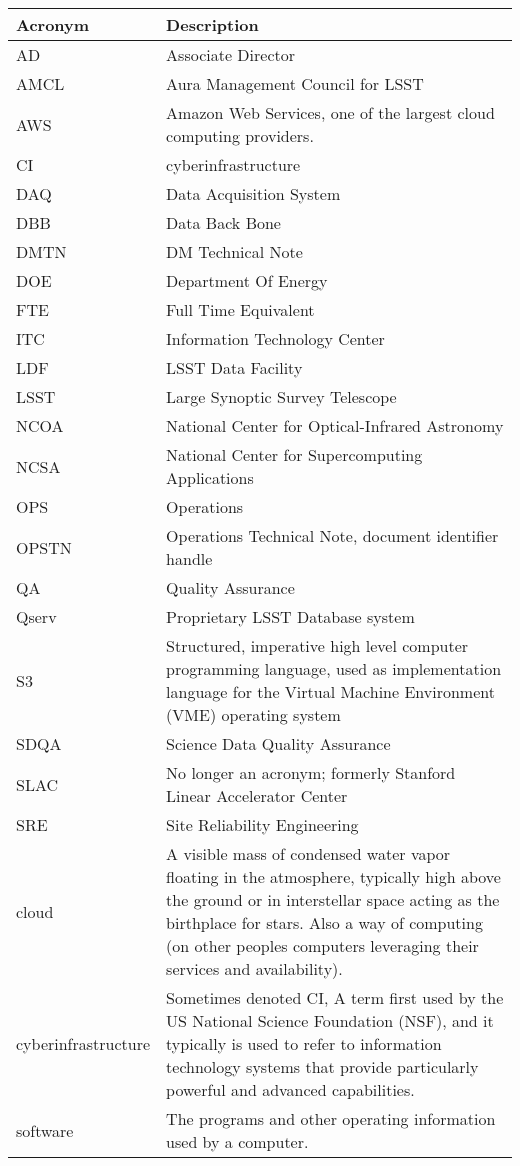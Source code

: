 \addtocounter{table}{-1}
\begin{longtable}{|l|p{}|}\hline
\textbf{Acronym} & \textbf{Description}  \\\hline

AD & Associate Director \\\hline
AMCL & Aura Management Council for LSST \\\hline
AWS & Amazon Web Services, one of the largest cloud computing providers. \\\hline
CI & \gls{cyberinfrastructure} \\\hline
DAQ & Data Acquisition System \\\hline
DBB & Data Back Bone \\\hline
DMTN & DM Technical Note \\\hline
DOE & Department Of Energy \\\hline
FTE & Full Time Equivalent \\\hline
ITC & Information Technology Center \\\hline
LDF & LSST Data Facility \\\hline
LSST & Large Synoptic Survey Telescope \\\hline
NCOA & National Center for Optical-Infrared Astronomy \\\hline
NCSA & National Center for Supercomputing Applications \\\hline
OPS & Operations \\\hline
OPSTN & Operations Technical Note, document identifier handle \\\hline
QA & Quality Assurance \\\hline
Qserv & Proprietary LSST Database system \\\hline
S3 & Structured, imperative high level computer programming language, used as implementation language for the Virtual Machine Environment (\gls{VME}) operating system \\\hline
SDQA & Science Data Quality Assurance \\\hline
SLAC & No longer an acronym; formerly Stanford Linear Accelerator Center \\\hline
SRE & Site Reliability Engineering \\\hline
cloud & A visible mass of condensed water vapor floating in the atmosphere, typically high above the ground or in interstellar space acting as the birthplace for stars.  Also a way of computing (on other peoples computers leveraging their services and availability). \\\hline
cyberinfrastructure & Sometimes denoted CI, A term first used by the US National Science Foundation (\gls{NSF}), and it typically is used to refer to information technology systems that provide particularly powerful and advanced capabilities. \\\hline
software & The programs and other operating information used by a computer. \\\hline
\end{longtable}
